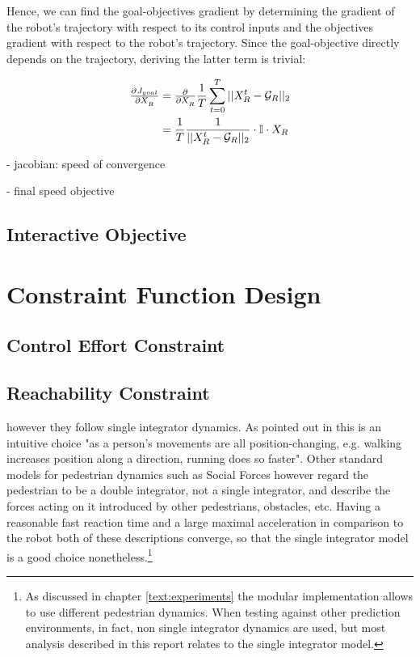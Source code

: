 Hence, we can find the goal-objectives gradient by determining the gradient of the robot's trajectory with respect to its control inputs and the objectives gradient with respect to the robot's trajectory. Since the goal-objective directly depends on the trajectory, deriving the latter term is trivial: 

\begin{align}
\pd{J_{goal}}{X_R} &= \pd{}{X_R} \frac{1}{T} \sum_{t = 0}^T ||X_R^t - \mathcal{G}_R||_2 \\
&= \frac{1}{T} \frac{1}{||X_R^t - \mathcal{G}_R||_2} \cdot \mathbb{I} \cdot X_R
\end{align}




- jacobian: speed of convergence

- final speed objective

\subsection{Interactive Objective}
\label{text:approach/objective/interactive}

\section{Constraint Function Design}
\label{text:approach/constraint}

\subsection{Control Effort Constraint}
\label{text:approach/constraint/dynamics}

\subsection{Reachability Constraint}
\label{text:approach/constraint/reachability}

however they follow single integrator dynamics. As pointed out in \cite{Ivanovic18} this is an intuitive choice "as a person’s movements are all position-changing, e.g. walking increases position along a direction, running does so faster". Other standard models for pedestrian dynamics such as Social Forces \cite{Helbling1995} however regard the pedestrian to be a double integrator, not a single integrator, and describe the forces acting on it introduced by other pedestrians, obstacles, etc. Having a reasonable fast reaction time and a large maximal acceleration in comparison to the robot both of these descriptions converge, so that the single integrator model is a good choice nonetheless.\footnote{As discussed in chapter \ref{text:experiments} the modular implementation allows to use different pedestrian dynamics. When testing against other prediction environments, in fact, non single integrator dynamics are used, but most analysis described in this report relates to the single integrator model.} 

